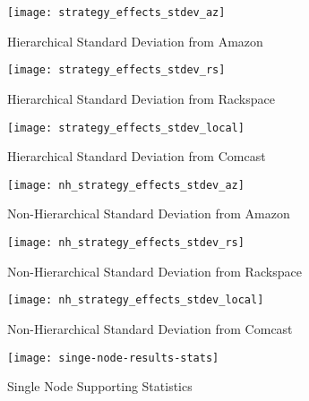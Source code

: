 
\begin{figure}[!t]
\centering
\texttt{[image: strategy\_effects\_stdev\_az]}
\caption{Hierarchical Standard Deviation from Amazon}
\end{figure}

\begin{figure}[!t]
\centering
\texttt{[image: strategy\_effects\_stdev\_rs]}
\caption{Hierarchical Standard Deviation from Rackspace}
\end{figure}

\begin{figure}[!t]
\centering
\texttt{[image: strategy\_effects\_stdev\_local]}
\caption{Hierarchical Standard Deviation from Comcast}
\end{figure}

\begin{figure}[!t]
\centering
\texttt{[image: nh\_strategy\_effects\_stdev\_az]}
\caption{Non-Hierarchical Standard Deviation from Amazon}
\end{figure}

\begin{figure}[!t]
\centering
\texttt{[image: nh\_strategy\_effects\_stdev\_rs]}
\caption{Non-Hierarchical Standard Deviation from Rackspace}
\end{figure}

\begin{figure}[!t]
\centering
\texttt{[image: nh\_strategy\_effects\_stdev\_local]}
\caption{Non-Hierarchical Standard Deviation from Comcast}
\end{figure}

\begin{figure}[!t]
\centering
\texttt{[image: singe-node-results-stats]}
\caption{Single Node Supporting Statistics}
\end{figure}